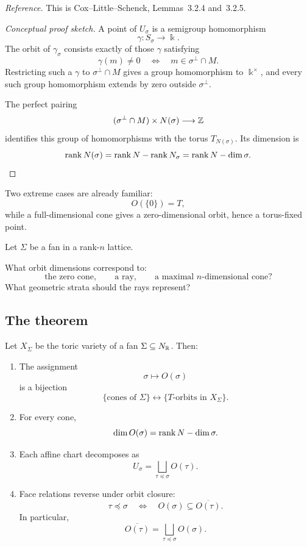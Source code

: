 \noindent
\textit{Reference.}
This is Cox--Little--Schenck, Lemmas~3.2.4 and~3.2.5.

\begin{proof}[Conceptual proof sketch]
A point of \(U_\sigma\) is a semigroup homomorphism
\[
\gamma:S_\sigma\longrightarrow\Bbbk.
\]
The orbit of \(\gamma_\sigma\) consists exactly of those \(\gamma\)
satisfying
\[
\gamma(m)\neq0
\quad\Longleftrightarrow\quad
m\in\sigma^\perp\cap M.
\]
Restricting such a \(\gamma\) to
\(\sigma^\perp\cap M\) gives a group homomorphism to
\(\Bbbk^\times\), and every such group homomorphism extends by zero
outside \(\sigma^\perp\).

The perfect pairing
\[
(\sigma^\perp\cap M)\times N(\sigma)\longrightarrow\mathbb{Z}
\]
identifies this group of homomorphisms with the torus \(T_{N(\sigma)}\).
Its dimension is
\[
\operatorname{rank} N(\sigma)
=
\operatorname{rank} N-\operatorname{rank} N_\sigma
=
\operatorname{rank} N-\dim\sigma.
\]
\end{proof}

Two extreme cases are already familiar:
\[
O(\{0\})=T,
\]
while a full-dimensional cone gives a zero-dimensional orbit, hence a
torus-fixed point.

\begin{pauseandthink}
Let \(\Sigma\) be a fan in a rank-\(n\) lattice.

What orbit dimensions correspond to:
\[
\text{the zero cone},\qquad
\text{a ray},\qquad
\text{a maximal \(n\)-dimensional cone}?
\]
What geometric strata should the rays represent?
\end{pauseandthink}

\subsection{The theorem}

\begin{theorem}
\label{thm:orbit-cone-correspondence}
Let \(X_\Sigma\) be the toric variety of a fan
\(\Sigma\subseteq N_{\mathbb{R}}\). Then:

\begin{enumerate}[label=(\alph*),wide=0pt]
\item The assignment
\[
\sigma\longmapsto O(\sigma)
\]
is a bijection
\[
\{\text{cones of }\Sigma\}
\longleftrightarrow
\{\text{\(T\)-orbits in }X_\Sigma\}.
\]

\item For every cone,
\[
\dim O(\sigma)
=
\operatorname{rank} N-\dim\sigma.
\]

\item Each affine chart decomposes as
\[
U_\sigma
=
\bigsqcup_{\tau\preceq\sigma}O(\tau).
\]

\item Face relations reverse under orbit closure:
\[
\tau\preceq\sigma
\quad\Longleftrightarrow\quad
O(\sigma)\subseteq\overline{O(\tau)}.
\]
In particular,
\[
\overline{O(\tau)}
=
\bigsqcup_{\tau\preceq\sigma}O(\sigma).
\]
\end{enumerate}
\end{theorem}


